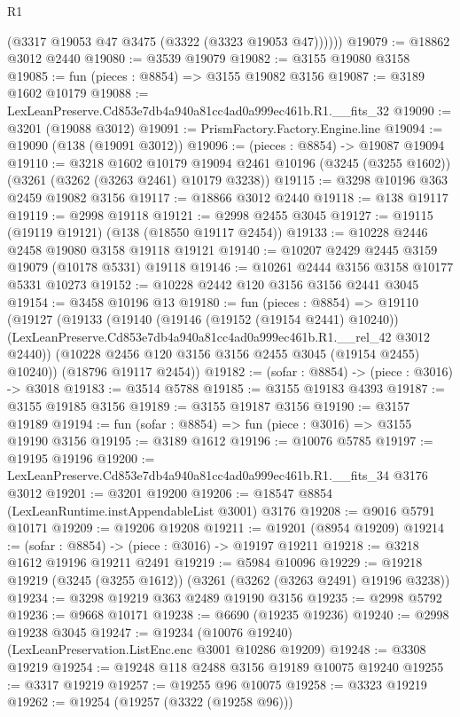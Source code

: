 \begin{lexlean}{R1}
\begin{coremodule}
          (@3317 @19053 @47 @3475 (@3322 (@3323 @19053 @47))))))
@19079 := @18862 @3012 @2440
@19080 := @3539 @19079
@19082 := @3155 @19080 @3158
@19085 := fun (pieces : @8854) => @3155 @19082 @3156
@19087 := @3189 @1602 @10179
@19088 := LexLeanPreserve.Cd853e7db4a940a81cc4ad0a999ec461b.R1.__fits_32
@19090 := @3201 (@19088 @3012)
@19091 := PrismFactory.Factory.Engine.line
@19094 := @19090 (@138 (@19091 @3012))
@19096 := (pieces : @8854) -> @19087 @19094
@19110 := @3218
    @1602
    @10179
    @19094
    @2461
    @10196
    (@3245 (@3255 @1602))
    (@3261 (@3262 (@3263 @2461) @10179 @3238))
@19115 := @3298 @10196 @363 @2459 @19082 @3156
@19117 := @18866 @3012 @2440
@19118 := @138 @19117
@19119 := @2998 @19118
@19121 := @2998 @2455 @3045
@19127 := @19115 (@19119 @19121) (@138 (@18550 @19117 @2454))
@19133 := @10228 @2446 @2458 @19080 @3158 @19118 @19121
@19140 := @10207 @2429 @2445 @3159 @19079 (@10178 @5331) @19118
@19146 := @10261 @2444 @3156 @3158 @10177 @5331 @10273
@19152 := @10228 @2442 @120 @3156 @3156 @2441 @3045
@19154 := @3458 @10196 @13
@19180 := fun (pieces : @8854) =>
  @19110
    (@19127
      (@19133
        (@19140
          (@19146 (@19152 (@19154 @2441) @10240))
          (LexLeanPreserve.Cd853e7db4a940a81cc4ad0a999ec461b.R1.__rel_42 @3012 @2440))
        (@10228 @2456 @120 @3156 @3156 @2455 @3045 (@19154 @2455) @10240))
      (@18796 @19117 @2454))
@19182 := (sofar : @8854) -> (piece : @3016) -> @3018
@19183 := @3514 @5788
@19185 := @3155 @19183 @4393
@19187 := @3155 @19185 @3156
@19189 := @3155 @19187 @3156
@19190 := @3157 @19189
@19194 := fun (sofar : @8854) => fun (piece : @3016) => @3155 @19190 @3156
@19195 := @3189 @1612
@19196 := @10076 @5785
@19197 := @19195 @19196
@19200 := LexLeanPreserve.Cd853e7db4a940a81cc4ad0a999ec461b.R1.__fits_34 @3176 @3012
@19201 := @3201 @19200
@19206 := @18547 @8854 (LexLeanRuntime.instAppendableList @3001) @3176
@19208 := @9016 @5791 @10171
@19209 := @19206 @19208
@19211 := @19201 (@8954 @19209)
@19214 := (sofar : @8854) -> (piece : @3016) -> @19197 @19211
@19218 := @3218 @1612 @19196 @19211 @2491
@19219 := @5984 @10096
@19229 := @19218 @19219 (@3245 (@3255 @1612)) (@3261 (@3262 (@3263 @2491) @19196 @3238))
@19234 := @3298 @19219 @363 @2489 @19190 @3156
@19235 := @2998 @5792
@19236 := @9668 @10171
@19238 := @6690 (@19235 @19236)
@19240 := @2998 @19238 @3045
@19247 := @19234 (@10076 @19240) (LexLeanPreservation.ListEnc.enc @3001 @10286 @19209)
@19248 := @3308 @19219
@19254 := @19248 @118 @2488 @3156 @19189 @10075 @19240
@19255 := @3317 @19219
@19257 := @19255 @96 @10075
@19258 := @3323 @19219
@19262 := @19254 (@19257 (@3322 (@19258 @96)))

\end{coremodule}
\end{lexlean}
